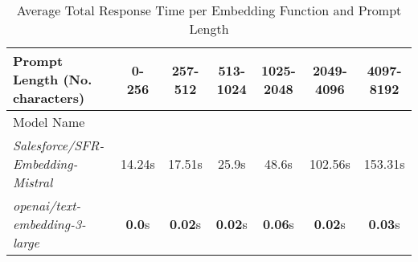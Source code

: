 
\begin{table}[H]
\centering
\scriptsize
\begin{tabular}{@{}lcccccc@{}}
\toprule
Prompt Length (No. characters) & 0-256 & 257-512 & 513-1024 & 1025-2048 & 2049-4096 & 4097-8192 \\
\midrule
Model Name &  &  &  &  &  &  \\
\textit{Salesforce/SFR-Embedding-Mistral} & 14.24s & 17.51s & 25.9s & 48.6s & 102.56s & 153.31s \\
\textit{openai/text-embedding-3-large} & \textbf{0.0}s & \textbf{0.02}s & \textbf{0.02}s & \textbf{0.06}s & \textbf{0.02}s & \textbf{0.03}s \\

\bottomrule
\end{tabular}
\caption{Average Total Response Time per Embedding Function and Prompt Length}
\label{tab:tab:average_response_time_by_length_embedding_functions}
\end{table}
